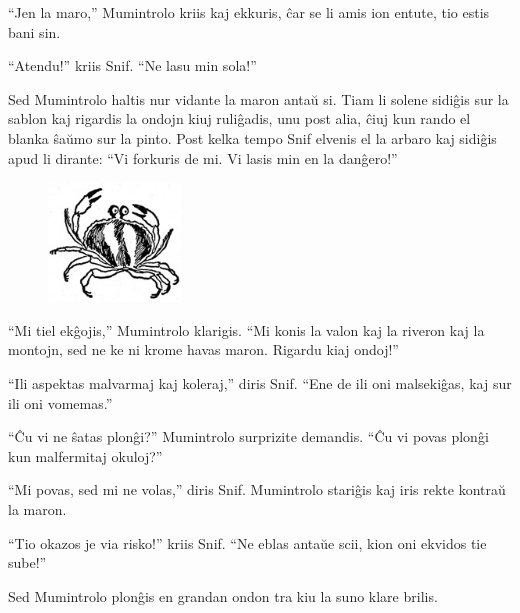 ``Jen la maro,'' Mumintrolo kriis kaj ekkuris, ĉar se li amis ion entute, tio estis bani sin.

``Atendu!'' kriis Snif. ``Ne lasu min sola!''

Sed Mumintrolo haltis nur vidante la maron antaŭ si. Tiam li solene sidiĝis sur la sablon kaj rigardis la ondojn kiuj ruliĝadis, unu post alia, ĉiuj kun rando el blanka ŝaŭmo sur la pinto. Post kelka tempo Snif elvenis el la arbaro kaj sidiĝis apud li dirante: ``Vi forkuris de mi. Vi lasis min en la danĝero!''

\begin{figure}[htbp]
\centering
\includegraphics[width=100pt,height=90pt]{1-4.png}
\caption{}
\label{1-4}
\end{figure}

``Mi tiel ekĝojis,'' Mumintrolo klarigis. ``Mi konis la valon kaj la riveron kaj la montojn, sed ne ke ni krome havas maron. Rigardu kiaj ondoj!''

``Ili aspektas malvarmaj kaj koleraj,'' diris Snif. ``Ene de ili oni malsekiĝas, kaj sur ili oni vomemas.''

``Ĉu vi ne ŝatas plonĝi?'' Mumintrolo surprizite demandis. ``Ĉu vi povas plonĝi kun malfermitaj okuloj?''

``Mi povas, sed mi ne volas,'' diris Snif. Mumintrolo stariĝis kaj iris rekte kontraŭ la maron.

``Tio okazos je via risko!'' kriis Snif. ``Ne eblas antaŭe scii, kion oni ekvidos tie sube!''

Sed Mumintrolo plonĝis en grandan ondon tra kiu la suno klare brilis.

